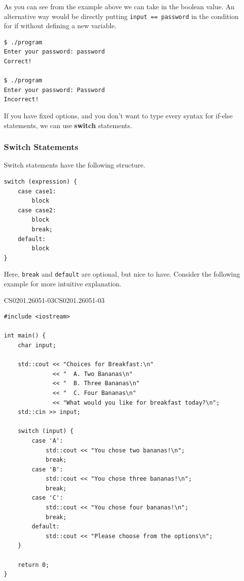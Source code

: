 \documentclass[../../main.tex]{subfiles}
\begin{document}
As you can see from the example above we can take in the boolean
value. An alternative way would be directly putting
\verb|input == password| in the condition for if without defining
a new variable.

\begin{outputbox}
\begin{lstlisting}[style=basic]
$ ./program
Enter your password: password
Correct!

$ ./program
Enter your password: Password
Incorrect!
\end{lstlisting}
\end{outputbox}

If you have fixed options, and you don't want to type every
syntax for if-else statements, we can use \textbf{switch}
statements.

\subsubsection{Switch Statements}

Switch statements have the following structure.

\begin{basicbox}
\begin{lstlisting}[style=basic]
switch (expression) {
    case case1:
        block
    case case2:
        block
        break;
    default:
        block
}
\end{lstlisting}
\end{basicbox}

Here, \verb|break| and \verb|default| are optional, but nice to
have. Consider the following example for more intuitive explanation.

\begin{cppbox}{CS0201.26051-03}{CS0201.26051-03}
\begin{lstlisting}[style=cppstyle]
#include <iostream>

int main() {
    char input;

    std::cout << "Choices for Breakfast:\n"
              << "  A. Two Bananas\n"
              << "  B. Three Bananas\n"
              << "  C. Four Bananas\n"
              << "What would you like for breakfast today?\n";
    std::cin >> input;

    switch (input) {
        case 'A':
            std::cout << "You chose two bananas!\n";
            break;
        case 'B':
            std::cout << "You chose three bananas!\n";
            break;
        case 'C':
            std::cout << "You chose four bananas!\n";
            break;
        default:
            std::cout << "Please choose from the options\n";
    }

    return 0;
}
\end{lstlisting}
\end{cppbox}
\end{document}
